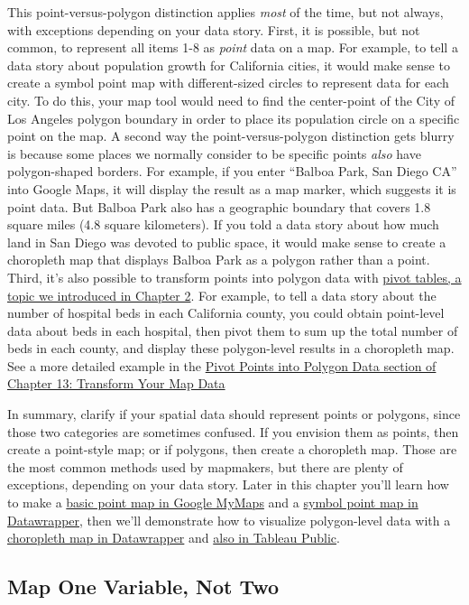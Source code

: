 \documentclass[
  english,
]{book}
\begin{document}
This point-versus-polygon distinction applies \emph{most} of the time, but not always, with exceptions depending on your data story. First, it is possible, but not common, to represent all items 1-8 as \emph{point} data on a map. For example, to tell a data story about population growth for California cities, it would make sense to create a symbol point map with different-sized circles to represent data for each city. To do this, your map tool would need to find the center-point of the City of Los Angeles polygon boundary in order to place its population circle on a specific point on the map. A second way the point-versus-polygon distinction gets blurry is because some places we normally consider to be specific points \emph{also} have polygon-shaped borders. For example, if you enter ``Balboa Park, San Diego CA'' into Google Maps, it will display the result as a map marker, which suggests it is point data. But Balboa Park also has a geographic boundary that covers 1.8 square miles (4.8 square kilometers). If you told a data story about how much land in San Diego was devoted to public space, it would make sense to create a choropleth map that displays Balboa Park as a polygon rather than a point. Third, it's also possible to transform points into polygon data with \href{pivot.html}{pivot tables, a topic we introduced in Chapter 2}. For example, to tell a data story about the number of hospital beds in each California county, you could obtain point-level data about beds in each hospital, then pivot them to sum up the total number of beds in each county, and display these polygon-level results in a choropleth map. See a more detailed example in the \href{pivot-point-to-polygon.html}{Pivot Points into Polygon Data section of Chapter 13: Transform Your Map Data}

In summary, clarify if your spatial data should represent points or polygons, since those two categories are sometimes confused. If you envision them as points, then create a point-style map; or if polygons, then create a choropleth map. Those are the most common methods used by mapmakers, but there are plenty of exceptions, depending on your data story. Later in this chapter you'll learn how to make a \href{mymaps.html}{basic point map in Google MyMaps} and a \href{symbolmap-datawrapper.html}{symbol point map in Datawrapper}, then we'll demonstrate how to visualize polygon-level data with a \href{choropleth-datawrapper.html}{choropleth map in Datawrapper} and \href{map-tableau.html}{also in Tableau Public}.

\hypertarget{map-one-variable-not-two}{%
\subsection*{Map One Variable, Not Two}\label{map-one-variable-not-two}}
\end{document}
